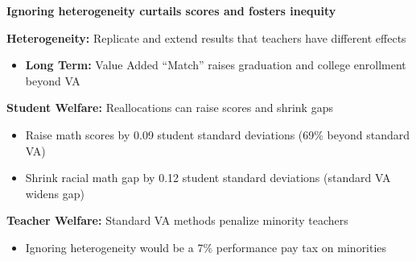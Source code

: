 \documentclass[t,aspectratio=169,11pt,presentation]{beamer}
\newenvironment{wideitemize}{\itemize\addtolength{\itemsep}{14pt}}{\enditemize}
\begin{document}
\begin{frame}{\textbf{Ignoring heterogeneity curtails scores and fosters inequity}}

            
\begin{wideitemize}
\item {\textbf{Heterogeneity:}} Replicate and extend results that teachers have different effects

{\tiny \color{gray}\citep{lockwood2009,condie2014teacher,bates2022teacher}}

\begin{itemize}
    \item<2-> {\textbf{Long Term:}} Value Added ``Match'' raises graduation and college enrollment beyond VA
\end{itemize}


\item<3-> {\textbf{Student Welfare:}} Reallocations can raise scores and shrink gaps 


\begin{itemize}
    \item  Raise math scores by 0.09 student standard deviations (69\% beyond standard VA)
    
    \item  Shrink racial math gap by 0.12 student standard deviations (standard VA widens gap)
    

    
    
\end{itemize}



\item<4-> {\textbf{Teacher Welfare:}} Standard VA methods penalize minority teachers

\begin{itemize}
    \item Ignoring heterogeneity would be a 7\% performance pay tax on minorities
    
    
\end{itemize}





\end{wideitemize}

\end{frame}
\end{document}
